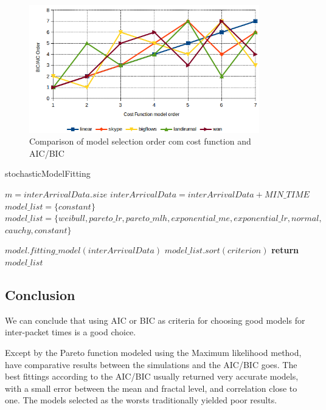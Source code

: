 \begin{figure}[t!]
	\centering
	\includegraphics[width=100mm]{figures/ch4/aic-bic_vs_costFunction_order}
	\caption{Comparison of model selection order com cost function and AIC/BIC}
    \label{fig:cost-function_vs_aic-bic}
\end{figure}	

\begin{algorithm}[ht!]
    \caption{stochasticModelFitting}
    \label{alg:stochasticModelFitting}
    \begin{algorithmic}[1]
        \small        {}
        \State $m = interArrivalData.size$
        \State $interArrivalData = interArrivalData + MIN\_TIME$
        \State $model\_list = \{constant\}$
        \Else
        \State $model\_list = \{weibull, pareto\_lr, pareto\_mlh, exponential\_me, exponential\_lr, normal,$
        \State $cauchy, constant\}$
        \EndIf
        
        \State $model.fitting\_model(interArrivalData)$
        \EndFor
        \State $model\_list.sort(criterion)$
        \State \textbf{return} $model\_list$
        \EndFunction
    \end{algorithmic}
\end{algorithm}


\subsection{Conclusion}



We can conclude that using AIC or BIC as criteria for choosing good models for inter-packet times is a good choice.

Except by the Pareto function modeled using the Maximum likelihood method, have comparative results between the simulations and the AIC/BIC goes. The best fittings according to the AIC/BIC usually returned very accurate models, with a small error between the mean and fractal level, and correlation close to one. The models selected as the worsts traditionally yielded poor results.

